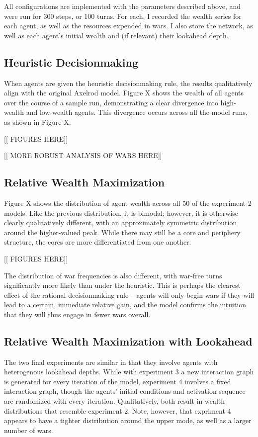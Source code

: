 \documentclass{article}
\begin{document}
All configurations are implemented with the parameters described above, and were run for 300 steps, or 100 turns. For each, I recorded the wealth series for each agent, as well as the resources expended in wars. I also store the network, as well as each agent's initial wealth and (if relevant) their lookahead depth. 

\subsection{Heuristic Decisionmaking}
When agents are given the heuristic decisionmaking rule, the results qualitatively align with the original Axelrod model. Figure X shows the wealth of all agents over the course of a sample run, demonstrating a clear divergence into high-wealth and low-wealth agents. This divergence occurs across all the model runs, as shown in Figure X. 

[[ FIGURES HERE]]

[[ MORE ROBUST ANALYSIS OF WARS HERE]]

\subsection{Relative Wealth Maximization}

Figure X shows the distribution of agent wealth across all 50 of the experiment 2 models. Like the previous distribution, it is bimodal; however, it is otherwise clearly qualitatively different, with an approximately symmetric distribution around the higher-valued peak. While there may still be a core and periphery structure, the cores are more differentiated from one another.

[[ FIGURES HERE]]

The distribution of war frequencies is also different, with war-free turns significantly more likely than under the heuristic. This is perhaps the clearest effect of the rational decisionmaking rule -- agents will only begin wars if they will lead to a certain, immediate relative gain, and the model confirms the intuition that they will thus engage in fewer wars overall. 

\subsection{Relative Wealth Maximization with Lookahead}

The two final experiments are similar in that they involve agents with heterogenous lookahead depths. While with experiment 3 a new interaction graph is generated for every iteration of the model, experiment 4 involves a fixed interaction graph, though the agents' initial conditions and activation sequence are randomized with every iteration. Qualitatively, both result in wealth distributions that resemble experiment 2. Note, however, that expriment 4 appears to have a tighter distribution around the upper mode, as well as a larger number of wars.
\end{document}
